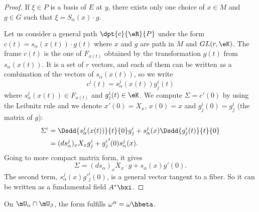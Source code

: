 \begin{proof}
If $\xi\in P$ is a basis of $E$ at $y$, there exists only one choice of $x\in M$ and $g\in G$ such that $\xi=S_{\alpha}(x)\cdot g$.

Let us consider a general path $\dpt{c}{\eR}{P}$ under the form $c(t)=s_{\alpha}(x(t))\cdot g(t)$ where $x$ and $g$ are path in $M$ and $GL(r,\eK)$. The frame $c(t)$ is the one of $F_{x(t)}$ obtained by the transformation $g(t)$ from $s_{\alpha}(x(t))$. It is a set of $r$ vectors, and each of them can be written as a combination of the vectors of $s_{\alpha}(x(t))$, so we write
\begin{equation}
  c^i(t)=s_{\alpha}^j(x(t))g_j^i(t)
\end{equation}
where $s_{\alpha}^j(x(t))\in F_{x(t)}$ and $g_j^i(t)\in\eK$. We compute $\Sigma=c'(0)$ by using the Leibnitz rule and we denote $x'(0)=X_x$, $x(0)=x$ and $g^i_j(0)=g^i_j$ (the matrix of $g$):
\begin{equation}
\begin{split}
  \Sigma^i&=\Dsdd{  s^j_{\alpha}(x(t))  }{t}{0}g^i_j+s^j_{\alpha}(x)\Dsdd{g^i_j(t)}{t}{0}\\
          &=(ds_{\alpha}^j)_xX_xg^i_j+{g^i_j}'(0)s^j_{\alpha}(x).
\end{split}
\end{equation}
Going to more compact matrix form, it gives
\[
  \Sigma=(ds_{\alpha})_xX_x\cdot g+s_{\alpha}(x)g'(0).
\]
The second term, $s_{\alpha}^j(x)g'^i_j(0)$, is a general vector tangent to a fiber. So it can be written as a fundamental field $A^*\bxi$.

\end{proof}

\begin{lemma}
On $\mU_{\alpha}\cap\mU_{\beta}$, the form fulfills $\omega^{\alpha}=\omega\hbeta$.
\end{lemma}

